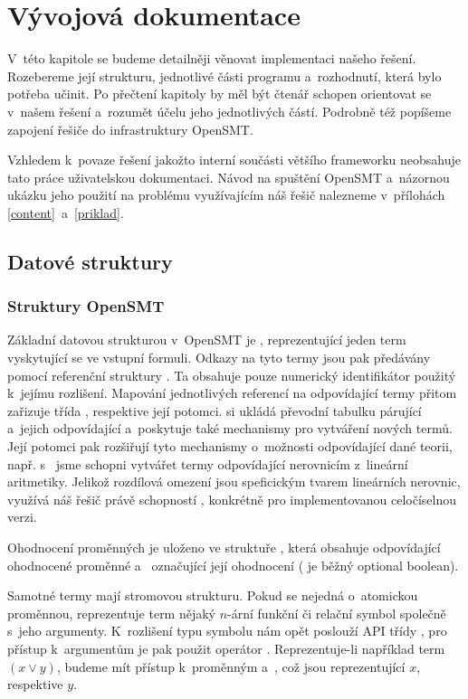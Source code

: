 \chapter{Vývojová dokumentace}
V~této kapitole se budeme detailněji věnovat implementaci našeho řešení. Rozebereme její strukturu, jednotlivé části programu a~rozhodnutí, která bylo potřeba učinit. Po přečtení kapitoly by měl být čtenář schopen orientovat se v~našem řešení a~rozumět účelu jeho jednotlivých částí. Podrobně též popíšeme zapojení řešiče do infrastruktury OpenSMT.

Vzhledem k~povaze řešení jakožto interní součásti většího frameworku neobsahuje tato práce uživatelskou dokumentaci. Návod na spuštění OpenSMT a~názornou ukázku jeho použití na problému využívajícím náš řešič nalezneme v~přílohách \ref{content}~a~\ref{priklad}.
\section{Datové struktury}\label{data}

\subsection*{Struktury OpenSMT}
Základní datovou strukturou v~OpenSMT je , reprezentující jeden term vyskytující se ve vstupní formuli. Odkazy na tyto termy jsou pak předávány pomocí referenční struktury . Ta obsahuje pouze numerický identifikátor použitý k~jejímu rozlišení. Mapování jednotlivých referencí na odpovídající termy přitom zařizuje třída , respektive její potomci.  si ukládá převodní tabulku párující  a~jejich odpovídající  a~poskytuje také mechanismy pro vytváření nových termů. Její potomci pak rozšiřují tyto mechanismy o~možnosti odpovídající dané teorii, např. s~ jsme schopni vytvářet termy odpovídající nerovnicím z~lineární aritmetiky. Jelikož rozdílová omezení jsou speficickým tvarem lineárních nerovnic, využívá náš řešič právě schopností , konkrétně  pro implementovanou celočíselnou verzi.

Ohodnocení proměnných je uloženo ve struktuře , která obsahuje  odpovídající ohodnocené proměnné a~ označující její ohodnocení ( je běžný optional boolean).

Samotné termy mají stromovou strukturu. Pokud se nejedná o~atomickou proměnnou, reprezentuje term nějaký $n$-ární funkční či relační symbol společně s~jeho argumenty. K~rozlišení typu symbolu nám opět poslouží API třídy , pro přístup k~argumentům je pak použit operátor \icode{[]}. Reprezentuje-li například  term $(x \lor y)$, budeme mít přístup k~proměnným  a~, což jsou  reprezentující $x$, respektive $y$. 

